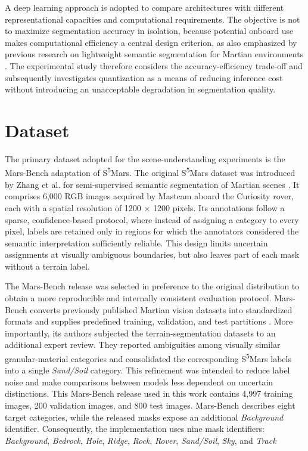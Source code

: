 A deep learning approach is adopted to compare architectures with different representational capacities and computational requirements. The objective is not to maximize segmentation accuracy in isolation, because potential onboard use makes computational efficiency a central design criterion, as also emphasized by previous research on lightweight semantic segmentation for Martian environments \cite{xiong2024light4mars}. The experimental study therefore considers the accuracy-efficiency trade-off and subsequently investigates quantization as a means of reducing inference cost without introducing an unacceptable degradation in segmentation quality.

\section{Dataset}
The primary dataset adopted for the scene-understanding experiments is the Mars-Bench adaptation of S\textsuperscript{5}Mars. The original S\textsuperscript{5}Mars dataset was introduced by Zhang et al. for semi-supervised semantic segmentation of Martian scenes \cite{zhang2024s5mars}. It comprises 6,000 RGB images acquired by Mastcam aboard the Curiosity rover, each with a spatial resolution of 1200 \(\times\) 1200 pixels. Its annotations follow a sparse, confidence-based protocol, where instead of assigning a category to every pixel, labels are retained only in regions for which the annotators considered the semantic interpretation sufficiently reliable. This design limits uncertain assignments at visually ambiguous boundaries, but also leaves part of each mask without a terrain label.

The Mars-Bench release was selected in preference to the original distribution to obtain a more reproducible and internally consistent evaluation protocol. Mars-Bench converts previously published Martian vision datasets into standardized formats and supplies predefined training, validation, and test partitions \cite{purohit2025marsbench}. More importantly, its authors subjected the terrain-segmentation datasets to an additional expert review. They reported ambiguities among visually similar granular-material categories and consolidated the corresponding S\textsuperscript{5}Mars labels into a single \emph{Sand/Soil} category. This refinement was intended to reduce label noise and make comparisons between models less dependent on uncertain distinctions. This Mars-Bench release used in this work contains 4,997 training images, 200 validation images, and 800 test images. Mars-Bench describes eight target categories, while the released masks expose an additional \emph{Background} identifier. Consequently, the implementation uses nine mask identifiers: \emph{Background}, \emph{Bedrock}, \emph{Hole}, \emph{Ridge}, \emph{Rock}, \emph{Rover}, \emph{Sand/Soil}, \emph{Sky}, and \emph{Track}

